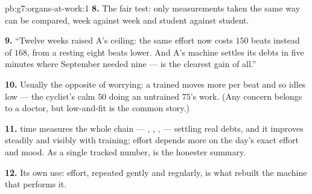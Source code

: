 \begin{solution}{pb:g7:organs-at-work:1}
\textbf{8.} The fair test: only measurements taken the
same way can be compared, week against week and student
against student.

\textbf{9.} ``Twelve weeks raised A's ceiling: the same
effort now costs $150$ beats instead of $168$, from a
resting  eight beats lower. And A's machine settles
its debts in five minutes where September needed nine ---
 is the clearest gain of all.''

\textbf{10.} Usually the opposite of worrying: a trained
 moves more  per beat and so idles low --- the
cyclist's calm $50$ doing an untrained $75$'s work. (Any
concern belongs to a doctor, but low-and-fit is the
common story.)

\textbf{11.}  time measures the whole chain ---
, , ,  --- settling real debts,
and it improves steadily and visibly with training;
effort  depends more on the day's exact effort and
mood. As a single tracked number,  is the
honester summary.

\textbf{12.} Its own use: effort, repeated gently and
regularly, is what rebuilt the machine that performs it.
\end{solution}

